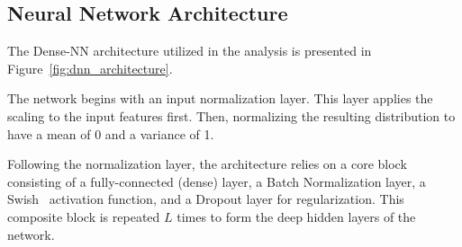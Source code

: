 \documentclass[12pt]{article}
\begin{document}

    \subsection{Neural Network Architecture}%
    \label{sub:neural_network_architecture}

        The Dense-NN architecture utilized in the analysis is presented in Figure~\ref{fig:dnn_architecture}. 

        The network begins with an input normalization layer. This layer applies the scaling to the input features first. Then, normalizing the resulting distribution to have a mean of 0 and a variance of 1.

        Following the normalization layer, the architecture relies on a core block consisting of a fully-connected (dense) layer, a Batch Normalization layer, a Swish~\cite{DBLP:journals/corr/abs-1710-05941} activation function, and a Dropout layer for regularization. This composite block is repeated $L$ times to form the deep hidden layers of the network.
\end{document}
